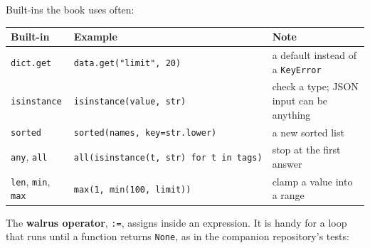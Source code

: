 \noindent{}Built-ins the book uses often:


{\def\LTcaptype{none} %
\begin{longtable}[]{@{}
  >{\raggedright\arraybackslash}p{}
  >{\raggedright\arraybackslash}p{}
  >{\raggedright\arraybackslash}p{}@{}}
\toprule\noalign{}
\begin{minipage}[b]{\linewidth}\raggedright
Built-in
\end{minipage} & \begin{minipage}[b]{\linewidth}\raggedright
Example
\end{minipage} & \begin{minipage}[b]{\linewidth}\raggedright
Note
\end{minipage} \\
\midrule\noalign{}
\endhead
\bottomrule\noalign{}
\endlastfoot
\texttt{dict.get} & \texttt{data.get("limit",}\allowbreak{}\texttt{\ 20)} & a default instead of a \texttt{KeyError} \\
\texttt{isinstance} & \texttt{isinstance(value,}\allowbreak{}\texttt{\ str)} & check a type; JSON input can be anything \\
\texttt{sorted} & \texttt{sorted(names,}\allowbreak{}\texttt{\ key=}\allowbreak{}\texttt{str.}\allowbreak{}\texttt{lower)} & a new sorted list \\
\texttt{any}, \texttt{all} & \texttt{all(isinstance(t,}\allowbreak{}\texttt{\ str)\ for\ t\ in\ tags)} & stop at the first answer \\
\texttt{len}, \texttt{min}, \texttt{max} & \texttt{max(1,}\allowbreak{}\texttt{\ min(100,}\allowbreak{}\texttt{\ limit))} & clamp a value into a range \\
\end{longtable}
}

The \textbf{walrus operator}, \texttt{:=}, assigns inside an expression. It is handy for a loop that runs until a function returns \texttt{None}, as in the companion repository's tests:

\begin{codebox}[short]

\begin{Shaded}
\begin{Highlighting}[]
\OperatorTok{:=}  \NormalTok{:}
\end{Highlighting}
\end{Shaded}

\end{codebox}

